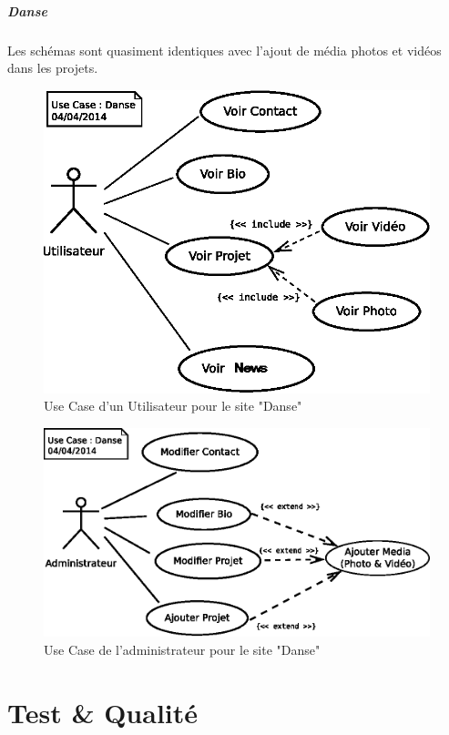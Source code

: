 \documentclass[11pt,a4paper]{report}
\begin{document}
					\subparagraph*{Danse}Les schémas sont quasiment identiques avec l'ajout de média photos et vidéos dans les projets.
						\begin{figure}[H]
							\centering
							\includegraphics[width=12cm]{UseCase-Danse-User.eps}
							\caption[Use Case Utilisateur Danse]{Use Case d'un Utilisateur pour le site "Danse"}
							\label{fig:UseCase-Danse User}
						\end{figure}
						\begin{figure}[H]
							\centering
							\includegraphics[width=16cm]{UseCase-Danse-Administrateur.eps}
							\caption[Use Case Administrateur Danse]{Use Case de l'administrateur pour le site "Danse"}
							\label{fig:UseCase-Danse Admin}
						\end{figure}
				\newpage
				
	\section{Test \& Qualité}
\end{document}
